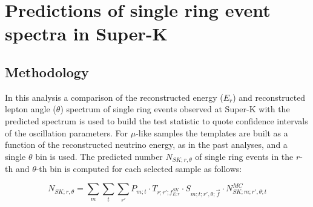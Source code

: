 \clearpage

\section {Predictions of single ring event spectra in Super-K}
\label{sec:spectrum_prediction}

\subsection {Methodology}

In this analysis a comparison of 
the reconstructed energy ($E_{r}$) and reconstructed lepton angle ($\theta$) spectrum
of single ring events observed at Super-K with the predicted spectrum
is used to build the test statistic to quote confidence intervals of the oscillation parameters.
For $\mu$-like samples the templates are built as a function of the reconstructed neutrino energy,
as in the past analyses, and a single $\theta$ bin is used.
The predicted number $N_{SK;r,\theta}$ 
of single ring events in the $r$-th and $\theta$-th bin
is computed for each selected sample as follows:

\begin{equation}
\displaystyle
  N_{SK;r,\theta} = 
    \sum_{m} \sum_{t} \sum_{r\prime}
        P_{m;t} \cdot
        T_{r;r\prime;f_{E; r}^{SK}} \cdot
        S_{m;t;r\prime,\theta;\vec{f}} \cdot
        N_{SK;m;r\prime,\theta;t}^{MC} 
         \label{eq:far_prediction}
\end{equation}

